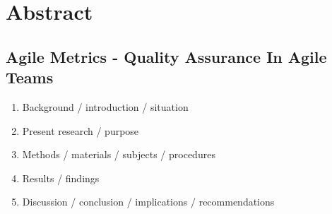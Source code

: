 \newpage
\chapter*{Abstract}
\section*{Agile Metrics {-} Quality Assurance In Agile Teams}

\begin{enumerate}
    \item Background / introduction / situation
    \item Present research / purpose
    \item Methods / materials / subjects / procedures
    \item Results / findings
    \item Discussion / conclusion / implications / recommendations
\end{enumerate}
